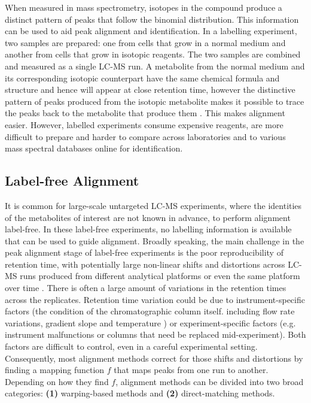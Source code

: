 When measured in mass spectrometry, isotopes in the compound produce a distinct pattern of peaks that follow the binomial distribution. This information can be used to aid peak alignment and identification. In a labelling experiment, two samples are prepared: one from cells that grow in a normal medium and another from cells that grow in isotopic reagents. The two samples are combined and measured as a single LC-MS run. A metabolite from the normal medium and its corresponding isotopic counterpart have the same chemical formula and structure and hence will appear at close retention time, however the distinctive pattern of peaks produced from the isotopic metabolite makes it possible to trace the peaks back to the metabolite that produce them \cite{chokkathukalam2014stable}. This makes alignment easier. However, labelled experiments consume expensive reagents, are more difficult to prepare and harder to compare across laboratories and to various mass spectral databases online for identification. 

\subsection{Label-free Alignment}

It is common for large-scale untargeted LC-MS experiments, where the identities of the metabolites of interest are not known in advance, to perform alignment label-free. In these label-free experiments, no labelling information is available that can be used to guide alignment. Broadly speaking, the main challenge in the peak alignment stage of label-free experiments is the poor reproducibility of retention time, with potentially large non-linear shifts and distortions across LC-MS runs produced from different analytical platforms or even the same platform over time \cite{podwojski2009retention}. There is often a large amount of variations in the retention times across the replicates. Retention time variation could be due to instrument-specific factors (the condition of the chromatographic column itself. including flow rate variations, gradient slope and temperature \cite{Christin2008}) or experiment-specific factors (e.g. instrument malfunctions or columns that need be replaced mid-experiment). Both factors are difficult to control, even in a careful experimental setting. Consequently, most alignment methods correct for those shifts and distortions by finding a mapping function $f$ that maps peaks from one run to another. Depending on how they find $f$, alignment methods can be divided into two broad categories: \textbf{(1)} warping-based methods and \textbf{(2)} direct-matching methods.


